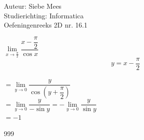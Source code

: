 \documentclass[a4paper]{article}
\begin{document}
  
\noindent \large Auteur: Siebe Mees \\
\noindent \large Studierichting: Informatica\\
\noindent \large Oefeningenreeks 2D nr. 16.1\\

\medskip

\normalsize

$\lim\limits_{x \rightarrow \tfrac{\pi}{2}} \dfrac{x- \dfrac{\pi}{2}}{\cos x} $\\ 

$$ y = x - \dfrac{\pi}{2} $$\\

$ = \lim\limits_{y \rightarrow 0} \dfrac{y}{\cos \left(y + \dfrac{\pi}{2}\right)} $\\ 

$ = \lim\limits_{y \rightarrow 0} \dfrac{y}{- \sin y} = - \lim\limits_{y \rightarrow 0} \dfrac{y}{\sin y} $\\ 

$ = -1 $\\

\begin{thebibliography}{999}
\end{thebibliography}
\end{document}
